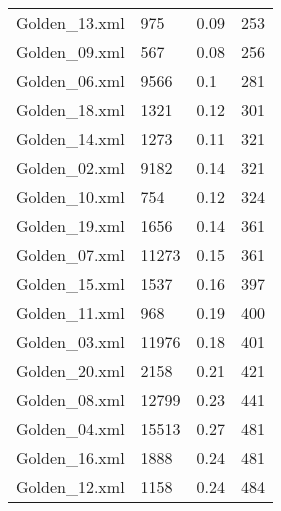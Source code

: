 \documentclass[12pt]{article}
\begin{document}
\begin{appendices}
\begin{table}[]
\begin{tabular}{llll}
	Golden\_13.xml & 975 & 0.09 & 253 \\
	Golden\_09.xml & 567 & 0.08 & 256 \\
	Golden\_06.xml & 9566 & 0.1 & 281 \\
	Golden\_18.xml & 1321 & 0.12 & 301 \\
	Golden\_14.xml & 1273 & 0.11 & 321 \\
	Golden\_02.xml & 9182 & 0.14 & 321 \\
	Golden\_10.xml & 754 & 0.12 & 324 \\
	Golden\_19.xml & 1656 & 0.14 & 361 \\
	Golden\_07.xml & 11273 & 0.15 & 361 \\
	Golden\_15.xml & 1537 & 0.16 & 397 \\
	Golden\_11.xml & 968 & 0.19 & 400 \\
	Golden\_03.xml & 11976 & 0.18 & 401 \\
	Golden\_20.xml & 2158 & 0.21 & 421 \\
	Golden\_08.xml & 12799 & 0.23 & 441 \\
	Golden\_04.xml & 15513 & 0.27 & 481 \\
	Golden\_16.xml & 1888 & 0.24 & 481 \\
	Golden\_12.xml & 1158 & 0.24 & 484
	\end{tabular}
	\end{table}

\end{appendices}
\end{document}

